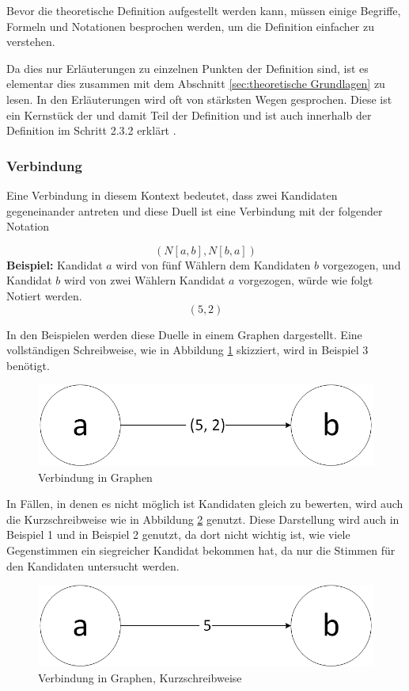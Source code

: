 Bevor die theoretische Definition aufgestellt werden kann, müssen einige Begriffe, Formeln und Notationen besprochen werden, um die Definition einfacher zu verstehen.

Da dies nur Erläuterungen zu einzelnen Punkten der Definition sind, ist es elementar dies zusammen mit dem Abschnitt \ref{sec:theoretische Grundlagen} zu lesen. In den Erläuterungen wird oft von stärksten Wegen gesprochen. Diese ist ein Kernstück der \schulze und damit Teil der Definition und ist auch innerhalb der Definition im Schritt 2.3.2 erklärt .


\subsubsection{Verbindung}
\label{sec:verbindung}
Eine Verbindung in diesem Kontext bedeutet, dass zwei Kandidaten gegeneinander antreten und diese Duell ist eine Verbindung mit der folgender Notation

\[
(N[a,b],N[b,a])
\]
\textbf{Beispiel:}
Kandidat $a$ wird von fünf Wählern dem Kandidaten $b$ vorgezogen, und Kandidat $b$ wird von zwei Wählern Kandidat $a$ vorgezogen, würde wie folgt Notiert werden. 
\[
(5,2)
\]

In den Beispielen werden diese Duelle in einem Graphen dargestellt. Eine vollständigen Schreibweise, wie in Abbildung \ref{fig:verbindung1} skizziert, wird in Beispiel 3 benötigt.

\begin{figure}[!h]
\centering
\includegraphics[scale=0.5]{Bilder/Definitionab.png}
\caption{Verbindung in Graphen}
\label{fig:verbindung1}
\end{figure}

In Fällen, in denen es nicht möglich ist Kandidaten gleich zu bewerten, wird auch die Kurzschreibweise wie in Abbildung \ref{fig:verbindung2} genutzt. Diese Darstellung wird auch in Beispiel 1 und in Beispiel 2 genutzt, da dort nicht wichtig ist, wie viele Gegenstimmen ein siegreicher Kandidat bekommen hat, da nur die Stimmen für den Kandidaten untersucht werden.

\begin{figure}[!h]
\centering
\includegraphics[scale=0.5]{Bilder/DefinitionShortab.png}
\caption{Verbindung in Graphen, Kurzschreibweise}
\label{fig:verbindung2}
\end{figure}

